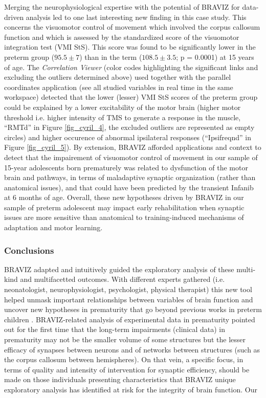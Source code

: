 \documentclass{frontiersHLTH}
\begin{document}
Merging the neurophysiological expertise with the potential of BRAVIZ for data-driven analysis led to  one last interesting new finding in this case study. This concerns the visuomotor control of movement which involved the corpus callosum function \cite{schneider_visuo-motor_2008} and which is assessed by the standardized score of the visuomotor integration test (VMI StS). This score was found to be significantly lower in the preterm group ($95.5\pm7$) than in the term ($108.5\pm3.5$; p = 0.0001) at 15 years of age. The \emph{Correlation Viewer} (color codes highlighting the significant links and excluding the outliers determined above) used together with the parallel coordinates application (see all studied variables in real time in the same workspace) detected  that the lower (lesser) VMI StS scores of the preterm group could be explained by a lower excitability of the motor brain (higher motor threshold i.e. higher intensity of TMS to generate a response in the muscle, “RMTd” in Figure \ref{fig_cyril_4}, the excluded outliers are represented as empty circles) and higher occurence of abnormal ipsilateral responses (“Ipsifreqnd” in Figure \ref{fig_cyril_5}). By extension, BRAVIZ afforded applications and context to detect that the impairement of visuomotor control of movement in our sample of 15-year adolescents born prematurely was related to dysfunction of the motor brain and pathways, in terms of maladaptive synaptic organization (rather than anatomical issues), and that could have been predicted by the transient Infanib at 6 months of age. Overall, these new hypotheses driven by BRAVIZ in our sample of preterm adolescent may impact early rehabilitation when synaptic issues are more sensitive than anatomical to training-induced mechanisms of adaptation and motor learning.

\subsubsection{Conclusions}

BRAVIZ adapted and intuitively guided the exploratory analysis of these multi-kind and multifacetted outcomes. With different experts gathered (i.e. neonatologist, neurophysiologist, psychologist, physical therapist) this new tool helped unmask important relationships between variables of brain function and uncover new hypotheses in prematurity that go beyond previous works in preterm children \cite{schneider_cerebral_2012, schneider_visuo-motor_2008, flamand_brain_2012}. BRAVIZ-related analysis of experimental data in prematurity pointed out for the first time that the long-term impairments (clinical data) in prematurity may not be the smaller volume of some structures but the lesser efficacy of synapses between neurons and of networks between structures (such as the corpus callosum between hemispheres). On that vein, a specific focus, in terms of quality and intensity of intervention for synaptic efficiency, should be made on those individuals presenting characteristics that BRAVIZ unique exploratory analysis has identified at risk for the integrity of brain function.
Our
  
\end{document}
